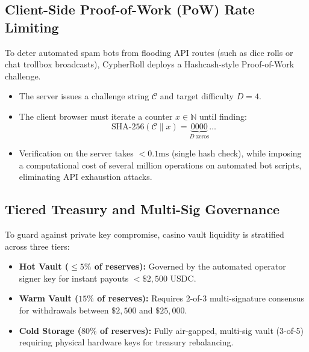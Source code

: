 \subsection{Client-Side Proof-of-Work (PoW) Rate Limiting}
To deter automated spam bots from flooding API routes (such as dice rolls or chat trollbox broadcasts), CypherRoll deploys a Hashcash-style Proof-of-Work challenge.
\begin{itemize}[leftmargin=1.5em]
    \item The server issues a challenge string $\mathcal{C}$ and target difficulty $D = 4$.
    \item The client browser must iterate a counter $x \in \mathbb{N}$ until finding:
    $$\text{SHA-256}(\mathcal{C} \parallel x) = \underbrace{0000}_{D \text{ zeros}} \dots$$
    \item Verification on the server takes $< 0.1\text{ms}$ (single hash check), while imposing a computational cost of several million operations on automated bot scripts, eliminating API exhaustion attacks.
\end{itemize}

\subsection{Tiered Treasury and Multi-Sig Governance}
To guard against private key compromise, casino vault liquidity is stratified across three tiers:
\begin{itemize}[leftmargin=1.5em]
    \item \textbf{Hot Vault ($\le 5\%$ of reserves):} Governed by the automated operator signer key for instant payouts $< \$2,500$ USDC.
    \item \textbf{Warm Vault ($15\%$ of reserves):} Requires 2-of-3 multi-signature consensus for withdrawals between $\$2,500$ and $\$25,000$.
    \item \textbf{Cold Storage ($80\%$ of reserves):} Fully air-gapped, multi-sig vault (3-of-5) requiring physical hardware keys for treasury rebalancing.
\end{itemize}
